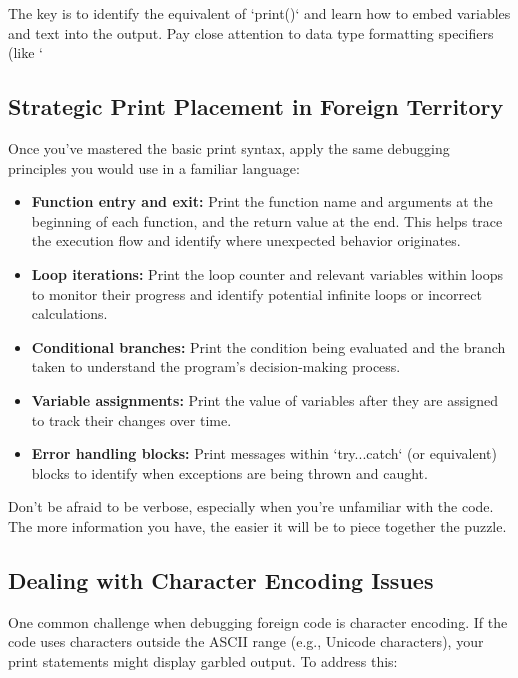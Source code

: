 \documentclass{article}
\begin{document}
{{{{The key is to identify the equivalent of `print()` and learn how to embed variables and text into the output. Pay close attention to data type formatting specifiers (like `%

\subsection*{Strategic Print Placement in Foreign Territory}

Once you've mastered the basic print syntax, apply the same debugging principles you would use in a familiar language:

\begin{itemize}
    \item \textbf{Function entry and exit:} Print the function name and arguments at the beginning of each function, and the return value at the end. This helps trace the execution flow and identify where unexpected behavior originates.
    \item \textbf{Loop iterations:} Print the loop counter and relevant variables within loops to monitor their progress and identify potential infinite loops or incorrect calculations.
    \item \textbf{Conditional branches:} Print the condition being evaluated and the branch taken to understand the program's decision-making process.
    \item \textbf{Variable assignments:} Print the value of variables after they are assigned to track their changes over time.
    \item \textbf{Error handling blocks:} Print messages within `try...catch` (or equivalent) blocks to identify when exceptions are being thrown and caught.
\end{itemize}

Don't be afraid to be verbose, especially when you're unfamiliar with the code. The more information you have, the easier it will be to piece together the puzzle.

\subsection*{Dealing with Character Encoding Issues}

One common challenge when debugging foreign code is character encoding. If the code uses characters outside the ASCII range (e.g., Unicode characters), your print statements might display garbled output. To address this:

}}}}
\end{document}
